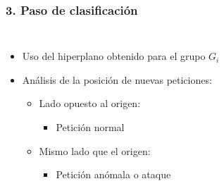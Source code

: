 \begin{frame}
    \frametitle{3. Paso de clasificación}

    \begin{columns}
        \begin{itemize}[<2->]
            \item
            Uso del hiperplano obtenido para el grupo $G_{i}$

            \item
            Análisis de la posición de nuevas peticiones:

            \begin{itemize}
                \item
                Lado opuesto al origen:

                \begin{itemize}
                    \item
                    Petición normal
                \end{itemize}

                \item
                Mismo lado que el origen:

                \begin{itemize}
                    \item
                    Petición anómala o ataque
                \end{itemize}
            \end{itemize}
        \end{itemize}

        \begin{center}
        \end{center}
    \end{columns}
\end{frame}

